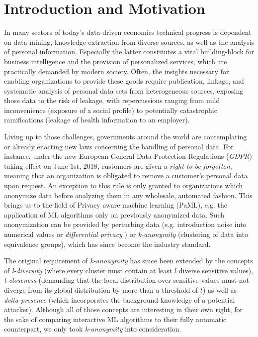 \documentclass{llncs}
\begin{document}
\renewcommand{\thesubfigure}{\thefigure.\arabic{subfigure}}
\makeatletter
\renewcommand{\p@subfigure}{}
\renewcommand{\@thesubfigure}{\thesubfigure:\hskip\subfiglabelskip}
\makeatother


\section{Introduction and Motivation}
\label{sect:intro_moti}

In many sectors of today's data-driven economies technical progress is dependent on data mining, knowledge extraction from diverse sources, as well as the analysis of personal information. Especially the latter constitutes a vital building-block for business intelligence and the provision of personalized services, which are practically demanded by modern society. Often, the insights necessary for enabling organizations to provide these goods require publication, linkage, and systematic analysis of personal data sets from heterogeneous sources, exposing those data to the risk of leakage, with repercussions ranging from mild inconvenience (exposure of a social profile) to potentially catastrophic ramifications (leakage of health information to an employer).

Living up to those challenges, governments around the world are contemplating or already enacting new laws concerning the handling of personal data. For instance, under the new European General Data Protection Regulations (\textit{GDPR}) taking effect on June 1st, 2018, customers are given a \textit{right to be forgotten}, meaning that an organization is obligated to remove a customer's personal data upon request. An exception to this rule is only granted to organizations which anonymize data before analyzing them in any wholesale, automated fashion. This brings us to the field of Privacy aware machine learning (PaML), e.g. the application of ML algorithms only on previously anonymized data. Such anonymization can be provided by perturbing data (e.g. introduction noise into numerical values or \textit{differential privacy} \cite{dwork2008differential}) or \textit{k-anonymity} \cite{Sweeney:2002:k-Anonymity} (clustering of data into equivalence groups), which has since become the industry standard.

The original requirement of \textit{k-anonymity} has since been extended by the concepts of \textit{l-diversity} \cite{MachanavajjhalaEtAl:2007:l-Diversity} (where every cluster must contain at least $l$ diverse sensitive values), \textit{t-closeness} \cite{LiEtAl:2007:t-closeness} (demanding that the local distribution over sensitive values must not diverge from its global distribution by more than a threshold of $t$) as well as \textit{delta-presence} \cite{NergizClifton:2010:Delta-Presence} (which incorporates the background knowledge of a potential attacker). Although all of those concepts are interesting in their own right, for the sake of comparing interactive ML algorithms to  their fully automatic counterpart, we only took \textit{k-anonymity} into consideration.
\end{document}
